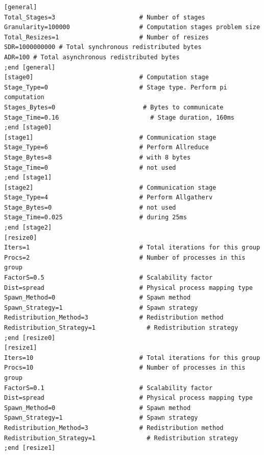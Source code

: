 \begin{lstlisting}[float,caption=Configuration file example., label=code:config-file, captionpos=b]
[general]
Total_Stages=3                       # Number of stages
Granularity=100000                   # Computation stages problem size
Total_Resizes=1                      # Number of resizes
SDR=1000000000 # Total synchronous redistributed bytes
ADR=100 # Total asynchronous redistributed bytes
;end [general]
[stage0]                             # Computation stage 
Stage_Type=0                         # Stage type. Perform pi computation
Stages_Bytes=0                        # Bytes to communicate
Stage_Time=0.16                         # Stage duration, 160ms
;end [stage0]
[stage1]                             # Communication stage 
Stage_Type=6                         # Perform Allreduce 
Stage_Bytes=8                        # with 8 bytes         
Stage_Time=0                         # not used
;end [stage1]  
[stage2]                             # Communication stage
Stage_Type=4                         # Perform Allgatherv 
Stage_Bytes=0                        # not used
Stage_Time=0.025                     # during 25ms
;end [stage2] 
[resize0]
Iters=1                              # Total iterations for this group
Procs=2                              # Number of processes in this group
FactorS=0.5                          # Scalability factor
Dist=spread                          # Physical process mapping type
Spawn_Method=0                       # Spawn method
Spawn_Strategy=1                     # Spawn strategy
Redistribution_Method=3              # Redistribution method
Redistribution_Strategy=1              # Redistribution strategy
;end [resize0]
[resize1]
Iters=10                             # Total iterations for this group
Procs=10                             # Number of processes in this group
FactorS=0.1                          # Scalability factor
Dist=spread                          # Physical process mapping type
Spawn_Method=0                       # Spawn method
Spawn_Strategy=1                     # Spawn strategy
Redistribution_Method=3              # Redistribution method
Redistribution_Strategy=1              # Redistribution strategy
;end [resize1]
\end{lstlisting}



